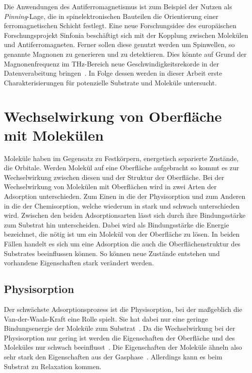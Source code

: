         Die Anwendungen des Antiferromagnetismus ist zum Beispiel der Nutzen als \textit{Pinning}-Lage, die in spinelektronischen Bauteilen die Orientierung einer ferromagnetischen Schicht festlegt.
        Eine neue Forschungsidee des europäischen Forschungsprojekt Sinfonia beschäftigt sich mit der Kopplung zwischen Molekülen und Antiferromagneten.
        Ferner sollen diese genutzt werden um Spinwellen, so genannte Magnonen zu generieren und zu detektieren.
        Dies könnte auf Grund der Magnonenfrequenz im \si{\tera\hertz}-Bereich neue Geschwindigkeitsrekorde in der Datenverabeitung bringen~\cite{SINFONIA}.
        In Folge dessen werden in dieser Arbeit erste Charakterisierungen für potenzielle Substrate und Moleküle untersucht.
                
    
    \section{Wechselwirkung von Oberfläche mit Molekülen} \label{sec:WW}
        Moleküle haben im Gegensatz zu Festkörpern, energetisch separierte Zustände, die Orbitale.
        Werden Molekül auf eine Oberfläche aufgebracht so kommt es zur Wechselwirkung zwischen diesen und der Struktur der Oberfläche.
        Bei der Wechselwirkung von Molekülen mit Oberflächen wird in zwei Arten der Adsorption unterschieden. 
        Zum Einen in die der Physisorption und zum Anderen in die der Chemisorption, welche wiederum in stark und schwach unterschieden wird.
        Zwischen den beiden Adsorptionsarten lässt sich durch ihre Bindungsstärke zum Substrat hin unterscheiden.
        Dabei wird als Bindungsstärke die Energie bezeichnet, die nötig ist um ein Molekül von der Oberfläche zu lösen.
        In beiden Fällen handelt es sich um eine Adsorption die auch die Oberflächenstruktur des Substrates beeinflussen können.
        So können neue Zustände entstehen und vorhandene Eigenschaften stark verändert werden.
        
        \subsection{Physisorption}
            Der schwächste Adsorptionsprozess ist die Physisorption, bei der maßgeblich die Van-der-Waals-Kraft eine Rolle spielt.
            Sie hat dabei nur eine geringe Bindungsenergie der Moleküle zum Substrat~\cite{cinchetti_activating_2017}.
            Da die Wechselwirkung bei der Physisorption nur gering ist werden die Eigenschaften der Oberfläche und des Moleküles nur schwach beeinflusst~\cite{bergenti_spinterface_2019}.
            Die Eigenschaften der Moleküle ähneln also sehr stark den Eigenschaften aus der Gasphase~\cite{cinchetti_activating_2017}.
            Allerdings kann es beim Substrat zu Relaxation kommen.

